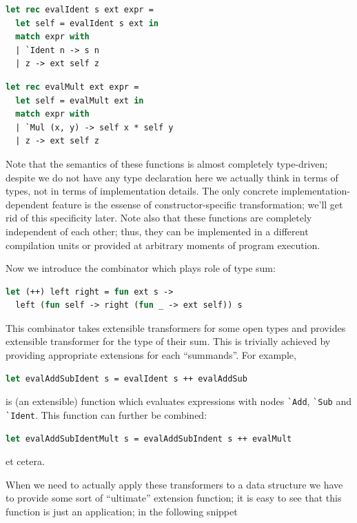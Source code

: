 \begin{lstlisting}[language=ocaml]
let rec evalIdent s ext expr =
  let self = evalIdent s ext in
  match expr with
  | `Ident n -> s n
  | z -> ext self z
\end{lstlisting}

\begin{lstlisting}[language=ocaml]
let rec evalMult ext expr =
  let self = evalMult ext in
  match expr with
  | `Mul (x, y) -> self x * self y
  | z -> ext self z
\end{lstlisting}

Note that the semantics of these functions is almost completely type-driven; despite
we do not have any type declaration here we actually think in terms of types, not
in terms of implementation details. The only concrete implementation-dependent feature
is the essense of constructor-specific transformation; we'll get rid of this specificity 
later. Note also that these functions are completely independent of each other; thus, they 
can be implemented in a different compilation units or provided at arbitrary moments of 
program execution.

Now we introduce the combinator which plays role of type sum:

\begin{lstlisting}[language=ocaml]
let (++) left right = fun ext s -> 
  left (fun self -> right (fun _ -> ext self)) s
\end{lstlisting}

This combinator takes extensible transformers for some open types and provides extensible transformer 
for the type of their sum. This is trivially achieved by providing appropriate extensions for each ``summands''.
For example,

\begin{lstlisting}[language=ocaml]
let evalAddSubIdent s = evalIdent s ++ evalAddSub
\end{lstlisting}

is (an extensible) function which evaluates expressions with nodes \lstinline{`Add}, \lstinline{`Sub} and
\lstinline{`Ident}. This function can further be combined:

\begin{lstlisting}[language=ocaml]
let evalAddSubIdentMult s = evalAddSubIndent s ++ evalMult
\end{lstlisting}

et cetera. 

When we need to actually apply these transformers to a data structure we have to provide
some sort of ``ultimate'' extension function; it is easy to see that this function is just
an application; in the following snippet

